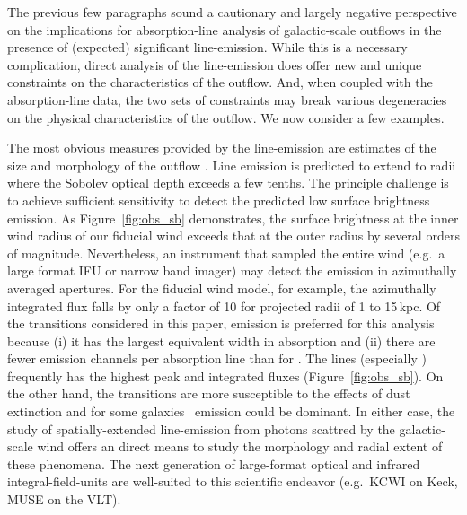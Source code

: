 \documentclass[12pt,preprint]{aastex}
\begin{document}


The previous few paragraphs sound a cautionary and largely negative
perspective on the implications for absorption-line analysis of
galactic-scale outflows in the presence of (expected) significant
line-emission.   While this is a necessary complication, direct analysis of
the line-emission does offer new and unique
constraints on the characteristics of the outflow.  And, when coupled
with the absorption-line data, the two sets of constraints may break
various degeneracies on the physical characteristics of the outflow.
We now consider a few examples.

The most obvious measures provided by the line-emission are
estimates
of the size and morphology of the outflow \citep{rubin+10c}.  
Line emission is predicted to extend to radii where the Sobolev
optical depth exceeds a few tenths.  The principle
challenge is to achieve sufficient sensitivity to detect the predicted
low
surface brightness emission. As Figure~\ref{fig:obs_sb}
demonstrates, the surface brightness at the inner wind radius of our
fiducial wind exceeds that at the outer radius by several orders of magnitude.
Nevertheless, an instrument that sampled the entire wind (e.g.\ a
large format IFU or narrow band imager) may detect the emission in
azimuthally averaged apertures. 
For the fiducial wind model, for example, the azimuthally integrated
flux falls by only a factor of 10 for projected radii of 1 to 15\,kpc.
Of the transitions considered in this paper,  emission is
preferred for this analysis because 
(i) it has the largest equivalent width in absorption and
(ii) there are fewer emission channels per absorption line than for
.  The  lines (especially \mgiib) frequently has the
highest peak and integrated fluxes (Figure~\ref{fig:obs_sb}).  
On the other hand, the  transitions are more susceptible to
the effects of dust extinction and for some galaxies \feiis\ emission
could be dominant.  In either case, the study of spatially-extended
line-emission from photons scattred by the galactic-scale wind offers
an direct means to study the morphology and radial extent of these
phenomena.  The next generation of large-format optical and infrared
integral-field-units are well-suited to this scientific endeavor
(e.g.\ KCWI on Keck, MUSE on the VLT).
\end{document}
